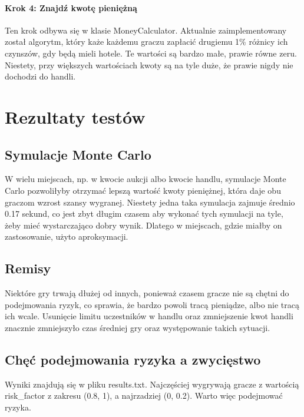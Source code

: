 \documentclass{article}
\begin{document}
\paragraph{Krok 4: Znajdź kwotę pieniężną}
Ten krok odbywa się w klasie MoneyCalculator. Aktualnie zaimplementowany został algorytm, który każe każdemu graczu zapłacić drugiemu 1\% różnicy ich czynszów, gdy będą mieli hotele. Te wartości są bardzo małe, prawie równe zeru. Niestety, przy większych wartościach kwoty są na tyle duże, że prawie nigdy nie dochodzi do handli.

\section{Rezultaty testów}

\subsection{Symulacje Monte Carlo}

W wielu miejscach, np. w kwocie aukcji albo kwocie handlu, symulacje Monte Carlo pozwoliłyby otrzymać lepszą wartość kwoty pieniężnej, która daje obu graczom wzrost szansy wygranej. Niestety jedna taka symulacja zajmuje średnio 0.17 sekund, co jest zbyt długim czasem aby wykonać tych symulacji na tyle, żeby mieć wystarczająco dobry wynik. Dlatego w miejscach, gdzie miałby on zastosowanie, użyto aproksymacji.

\subsection{Remisy}

Niektóre gry trwają dłużej od innych, ponieważ czasem gracze nie są chętni do podejmowania ryzyk, co sprawia, że bardzo powoli tracą pieniądze, albo nie tracą ich wcale. Usunięcie limitu uczestników w handlu oraz zmniejszenie kwot handli znacznie zmniejszyło czas średniej gry oraz występowanie takich sytuacji.

\subsection{Chęć podejmowania ryzyka a zwycięstwo}
Wyniki znajdują się w pliku results.txt. Najczęściej wygrywają gracze z wartością risk\_factor z zakresu (0.8, 1),  a najrzadziej (0, 0.2). Warto więc podejmować ryzyka.
\end{document}
